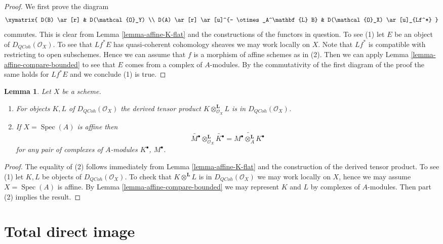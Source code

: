 \documentclass{stacks-project}
\theoremstyle{plain}
\newtheorem{lemma}[subsection]{Lemma}
\theoremstyle{definition}
\theoremstyle{remark}
\numberwithin{equation}{subsection}
\def\Spec{\mathop{\mathrm{Spec}}}
\def\QCoh{\mathit{QCoh}}
\begin{document}
\begin{proof}
We first prove the diagram
$$
\xymatrix{
D(B) \ar[r] & D(\mathcal{O}_Y) \\
D(A) \ar[r] \ar[u]^{- \otimes_A^\mathbf{L} B} &
D(\mathcal{O}_X) \ar[u]_{Lf^*}
}
$$
commutes. This is clear from Lemma \ref{lemma-affine-K-flat} and
the constructions of the functors in question. To see (1) let
$E$ be an object of $D_\QCoh(\mathcal{O}_X)$. To see that
$Lf^*E$ has quasi-coherent cohomology sheaves we may work locally on $X$.
Note that $Lf^*$ is compatible with restricting to open subschemes.
Hence we can assume that $f$ is a morphism of affine schemes as in (2).
Then we can apply Lemma \ref{lemma-affine-compare-bounded} to see that
$E$ comes from a complex of $A$-modules. By the commutativity of the first
diagram of the proof the same holds for $Lf^*E$ and we conclude (1) is true.
\end{proof}

\begin{lemma}
\label{lemma-quasi-coherence-tensor-product}
Let $X$ be a scheme.
\begin{enumerate}
\item For objects $K, L$ of $D_\QCoh(\mathcal{O}_X)$
the derived tensor product $K \otimes^\mathbf{L}_{\mathcal{O}_X} L$ is in
$D_\QCoh(\mathcal{O}_X)$.
\item If $X = \Spec(A)$ is affine then
$$
\widetilde{M^\bullet} \otimes_{\mathcal{O}_X}^\mathbf{L} \widetilde{K^\bullet}
=
\widetilde{M^\bullet \otimes_A^\mathbf{L} K^\bullet}
$$
for any pair of complexes of $A$-modules $K^\bullet$, $M^\bullet$.
\end{enumerate}
\end{lemma}

\begin{proof}
The equality of (2) follows immediately from Lemma \ref{lemma-affine-K-flat}
and the construction of the derived tensor product.
To see (1) let $K, L$ be objects of $D_\QCoh(\mathcal{O}_X)$.
To check that $K \otimes^\mathbf{L} L$ is in
$D_\QCoh(\mathcal{O}_X)$ we may work locally on $X$, hence
we may assume $X = \Spec(A)$ is affine. By
Lemma \ref{lemma-affine-compare-bounded} we may represent
$K$ and $L$ by complexes of $A$-modules. Then part (2) implies
the result.
\end{proof}





\section{Total direct image}
\label{section-total-direct-image}
\end{document}
